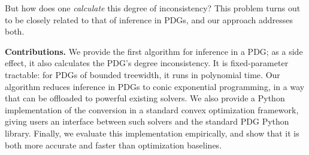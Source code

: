\documentclass{article}
\begin{document}
{%
        But how {does} one \emph{calculate} this degree of inconsistency?
This problem turns out to be closely related to that of
    inference in PDGs, and our approach addresses both.
}



\textbf{Contributions.}
We provide the first algorithm for inference in a PDG;
    as a side effect, it also calculates the PDG's degree inconsistency. 
It is fixed-parameter tractable: for PDGs of bounded treewidth,
it runs in polynomial time.
Our algorithm reduces inference in PDGs to conic exponential programming,
in a way that can be offloaded to powerful existing solvers.
We also provide a Python implementation of the conversion in a
standard convex optimization framework, giving users an
interface between such solvers and the standard PDG Python library.
Finally, we evaluate this implementation empirically, and show that it is both more accurate and faster than optimization baselines.
%
\end{document}
